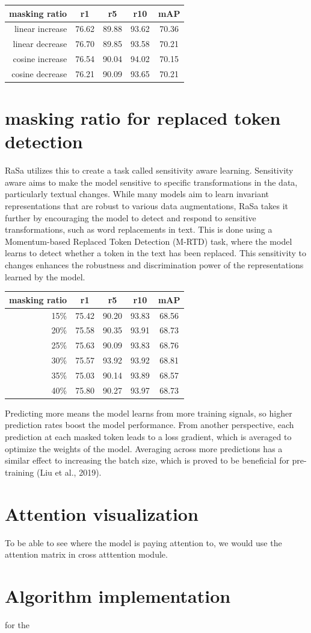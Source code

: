 \begin{tabular}{rcccc}
  masking ratio & r1 & r5 & r10 & mAP\\ \hline
  linear increase & 76.62 & 89.88 & 93.62 & 70.36 \\
  linear decrease & 76.70 & 89.85 & 93.58 & 70.21 \\
  cosine increase & 76.54 & 90.04 & 94.02 & 70.15 \\
  cosine decrease & 76.21 & 90.09 & 93.65 & 70.21 \\
\end{tabular}

\section{masking ratio for replaced token detection}
RaSa utilizes this to create a task called sensitivity aware learning.
Sensitivity aware aims to make the model sensitive to specific transformations in the data, particularly textual changes. While many models aim to learn invariant representations that are robust to various data augmentations, RaSa takes it further by encouraging the model to detect and respond to sensitive transformations, such as word replacements in text. This is done using a Momentum-based Replaced Token Detection (M-RTD) task, where the model learns to detect whether a token in the text has been replaced. This sensitivity to changes enhances the robustness and discrimination power of the representations learned by the model.

\begin{tabular}{rcccc}
  masking ratio & r1 & r5 & r10 & mAP \\ \hline
  15\% & 75.42 & 90.20 & 93.83 & 68.56 \\
  20\% & 75.58 & 90.35 & 93.91 & 68.73 \\
  25\% & 75.63 & 90.09 & 93.83 & 68.76 \\
  30\% & 75.57 & 93.92 & 93.92 & 68.81 \\
  35\% & 75.03 & 90.14 & 93.89 & 68.57 \\
  40\% & 75.80 & 90.27 & 93.97 & 68.73
\end{tabular}

Predicting more means the model learns from more training signals, so higher prediction rates boost the model performance. From another perspective, each prediction at each masked token leads to a loss gradient, which is averaged to optimize the weights of the model. Averaging across more predictions has a similar effect to increasing the batch size, which is proved to be beneficial for pre-training (Liu et al., 2019). 

\section{Attention visualization}
To be able to see where the model is paying attention to, we would use the attention matrix in cross atttention module. 



\section{Algorithm implementation}

for the 
